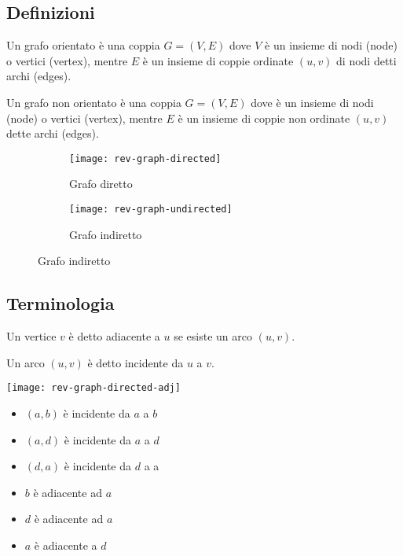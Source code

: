 \subsection{Definizioni}

\begin{definition}
	Un grafo orientato è una coppia \(G = (V,E)\) dove \(V\) è un insieme di nodi (node) o vertici (vertex), mentre \(E\) è un insieme di coppie ordinate \((u, v)\) di nodi detti archi (edges).
\end{definition}

\begin{definition}
	Un grafo non orientato è una coppia \(G = (V,E)\) dove è un insieme di nodi (node) o vertici (vertex), mentre \(E\) è un insieme di coppie \alert{non ordinate} \((u, v)\) dette archi (edges).
\end{definition}

\begin{figure}[H]
	\begin{subfigure}{.5\textwidth}\centering
		\texttt{[image: rev-graph-directed]}
		\caption{Grafo diretto}
	\end{subfigure}\hfill
	\begin{subfigure}{.5\textwidth}\centering
		\texttt{[image: rev-graph-undirected]}
		\caption{Grafo indiretto}
	\end{subfigure}
\end{figure}

\subsection{Terminologia}

\begin{property*}[Adiacenza]
	Un vertice \(v\) è detto \alert{adiacente} a \(u\) se esiste un arco \((u,v)\).
\end{property*}

\begin{property*}[Incidenza]
	Un arco \((u,v)\) è detto \alert{incidente} da \(u\) a \(v\).
\end{property*}

\clearpage
\begin{multicols}{2}
\centering
\texttt{[image: rev-graph-directed-adj]}
\columnbreak
\begin{itemize}
	\item \((a,b)\) è incidente da \(a\) a \(b\)
	\item \((a,d)\) è incidente da \(a\) a \(d\)
	\item \((d,a)\) è incidente da \(d\) a a
	\item \(b\) è adiacente ad \(a\)
	\item \(d\) è adiacente ad \(a\)
	\item \(a\) è adiacente a \(d\)
\end{itemize}
\end{multicols}

